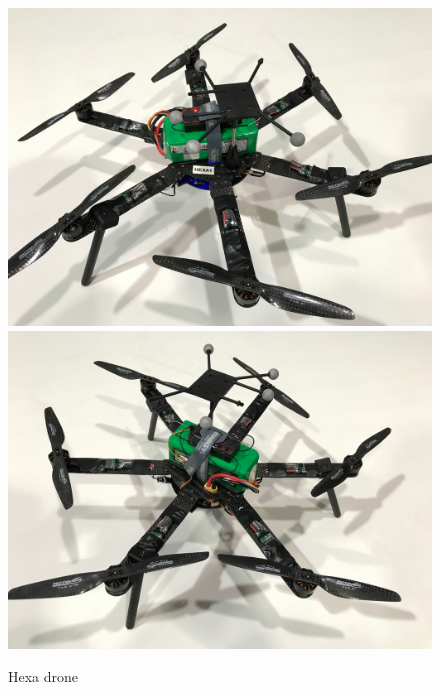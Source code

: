 \begin{figure}[!htb]
  \includegraphics[width=\linewidth]{chapters/chapter-02/figures/hexa_1.jpg}
\endminipage\hfill
{}
  \includegraphics[width=\linewidth]{chapters/chapter-02/figures/hexa_2.jpg}
\endminipage
\caption{Hexa drone}
\label{fig:hexa}
\end{figure}
